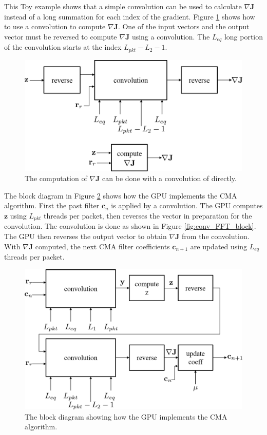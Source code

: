 This Toy example shows that a simple convolution can be used to calculate $\nabla \mathbf{J}$ instead of a long summation for each index of the gradient.
Figure \ref{fig:delJ_convORsum} shows how to use a convolution to compute $\nabla \mathbf{J}$.
One of the input vectors and the output vector must be reversed to compute $\nabla \mathbf{J}$ using a convolution.
The $L_{eq}$ long portion of the convolution starts at the index $L_{pkt} - L_2 - 1$.
\begin{figure}
	\centering\includegraphics[width=\textwidth/10*8]{figures/gpu/delJ_convORsum.png}
	\caption{The computation of $\nabla \mathbf{J}$ can be done with a convolution of directly.}
	\label{fig:delJ_convORsum}
\end{figure}
The block diagram in Figure \ref{fig:CMA_block} shows how the GPU implements the CMA algorithm.
First the past filter $\mathbf{c}_n$ is applied by a convolution.
The GPU computes $\mathbf{z}$ using $L_{pkt}$ threads per packet, then reverses the vector in preparation for the convolution.
The convolution is done as shown in Figure \ref{fig:conv_FFT_block}.
The GPU then reverses the output vector to obtain $\nabla \mathbf{J}$ from the convolution.
With $\nabla \mathbf{J}$ computed, the next CMA filter coefficients $\mathbf{c}_{n+1}$ are updated using $L_{eq}$ threads per packet.
\begin{figure}
	\centering\includegraphics[width=\textwidth/10*8]{figures/gpu/CMA_block.png}
	\caption{The block diagram showing how the GPU implements the CMA algorithm.}
	\label{fig:CMA_block}
\end{figure}


